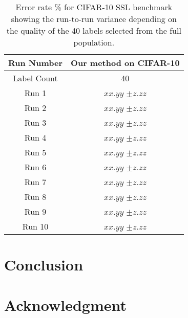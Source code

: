 \documentclass[10pt,twocolumn,letterpaper]{article}
\begin{document}
\begin{table}[htbp]
	\begin{tabular}{c|c}
		Run Number            & Our method on CIFAR-10 \\ 
		\hline
		Label Count           & 40                     \\
		\hline
		Run 1   & $xx.yy$ \scriptsize{$\pm z.zz$}     \\ 
		Run 2      & $xx.yy$ \scriptsize{$\pm z.zz$}    \\
		Run 3   & $xx.yy$ \scriptsize{$\pm z.zz$}   \\
		Run 4    & $xx.yy$ \scriptsize{$\pm z.zz$}   \\
		Run 5    & $xx.yy$ \scriptsize{$\pm z.zz$}     \\ 
		Run 6    & $xx.yy$ \scriptsize{$\pm z.zz$}     \\ 
		Run 7    & $xx.yy$ \scriptsize{$\pm z.zz$}     \\ 
		Run 8    & $xx.yy$ \scriptsize{$\pm z.zz$}     \\ 
		Run 9    & $xx.yy$ \scriptsize{$\pm z.zz$}     \\ 
		Run 10    & $xx.yy$ \scriptsize{$\pm z.zz$}     \\ 
	\end{tabular}
	\caption{Error rate \% for CIFAR-10 SSL benchmark showing the run-to-run variance depending on the quality of the 40 labels selected from the full population.}
	\label{table4}
\end{table}




\section{Conclusion}


\section{Acknowledgment}


{
	\small
	
	
}
\end{document}
